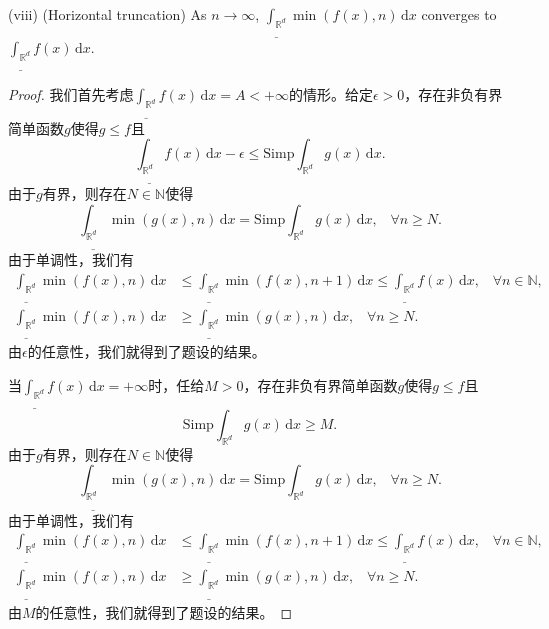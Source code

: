 \documentclass[reqno,a4paper,10pt]{amsart}
\newcommand\dif{\,\mathrm{d}}
\newcommand\Rnum{\mathbb{R}}
\begin{document}
(viii) (Horizontal truncation) As $n\to\infty$, $\underline{\int_{\Rnum^d}}\min(f(x),n)\dif x$ converges to $\underline{\int_{\Rnum^d}}f(x)\dif x$.
\begin{proof}
    我们首先考虑$\underline{\int_{\Rnum^d}}f(x)\dif x=A< +\infty$的情形。给定$\epsilon>0$，存在非负有界简单函数$g$使得$g\leq f $且
    \begin{equation*}
        \underline{\int_{\Rnum^d}}f(x)\dif x-\epsilon\leq \mathrm{Simp}\int_{\Rnum^d}g(x)\dif x.
    \end{equation*}
    由于$g$有界，则存在$N\in\mathbb{N}$使得
    \begin{equation*}
        \underline{\int_{\Rnum^d}}\min(g(x),n)\dif x=\mathrm{Simp}\int_{\Rnum^d}g(x)\dif x,\;\;\;\forall n\geq N.
    \end{equation*}
    由于单调性，我们有
    \begin{equation*}
        \begin{split}
            \underline{\int_{\Rnum^d}}\min(f(x),n)\dif x&\leq \underline{\int_{\Rnum^d}}\min(f(x),n+1)\dif x\leq \underline{\int_{\Rnum^d}}f(x)\dif x,\;\;\;\forall n\in\mathbb{N},\\
            \underline{\int_{\Rnum^d}}\min(f(x),n)\dif x&\geq \underline{\int_{\Rnum^d}}\min(g(x),n)\dif x,\;\;\;\forall n\geq N.
        \end{split}
    \end{equation*}
    由$\epsilon$的任意性，我们就得到了题设的结果。

    当$\underline{\int_{\Rnum^d}}f(x)\dif x=+\infty$时，任给$M>0$，存在非负有界简单函数$g$使得$g\leq f$且
    \begin{equation*}
        \mathrm{Simp}\int_{\Rnum^d}g(x)\dif x\geq M.
    \end{equation*}
    由于$g$有界，则存在$N\in\mathbb{N}$使得
    \begin{equation*}
        \underline{\int_{\Rnum^d}}\min(g(x),n)\dif x=\mathrm{Simp}\int_{\Rnum^d}g(x)\dif x,\;\;\;\forall n\geq N.
    \end{equation*}
    由于单调性，我们有
    \begin{equation*}
        \begin{split}
            \underline{\int_{\Rnum^d}}\min(f(x),n)\dif x&\leq \underline{\int_{\Rnum^d}}\min(f(x),n+1)\dif x\leq \underline{\int_{\Rnum^d}}f(x)\dif x,\;\;\;\forall n\in\mathbb{N},\\
            \underline{\int_{\Rnum^d}}\min(f(x),n)\dif x&\geq \underline{\int_{\Rnum^d}}\min(g(x),n)\dif x,\;\;\;\forall n\geq N.
        \end{split}
    \end{equation*}
    由$M$的任意性，我们就得到了题设的结果。
\end{proof}
\end{document}
